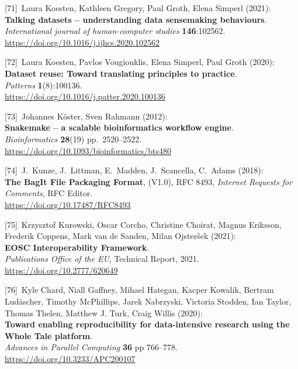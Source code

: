 {[}71{]}~Laura Koesten, Kathleen Gregory, Paul Groth, Elena Simperl
(2021):\\
\textbf{Talking datasets -- understanding data sensemaking
behaviours}.\\
\emph{International journal of human-computer studies}
\textbf{146}:102562.\\
\url{https://doi.org/10.1016/j.ijhcs.2020.102562}

{[}72{]}~Laura Koesten, Pavlos Vougiouklis, Elena Simperl, Paul Groth
(2020):\\
\textbf{Dataset reuse: Toward translating principles to practice}.\\
\emph{Patterns} \textbf{1}(8):100136.\\
\url{https://doi.org/10.1016/j.patter.2020.100136}

{[}73{]}~Johannes Köster, Sven Rahmann (2012):\\
\textbf{Snakemake -- a scalable bioinformatics workflow engine}.\\
\emph{Bioinformatics} \textbf{28}(19) pp.~2520--2522.\\
\url{https://doi.org/10.1093/bioinformatics/bts480}

{[}74{]}~J.~Kunze, J.~Littman, E.~Madden, J.~Scancella, C.~Adams
(2018):\\
\textbf{The BagIt File Packaging Format}, (V1.0), RFC 8493,
\emph{Internet Requests for Comments}, RFC Editor.\\
\url{https://doi.org/10.17487/RFC8493}

{[}75{]}~Krzysztof Kurowski, Oscar Corcho, Christine Choirat, Magnus
Eriksson, Frederik Coppens, Mark van de Sanden, Milan Ojsteršek
(2021):\\
\textbf{EOSC Interoperability Framework}.\\
\emph{Publications Office of the EU}, Technical Report, 2021.\\
\url{https://doi.org/10.2777/620649}

{[}76{]}~Kyle Chard, Niall Gaffney, Mihael Hategan, Kacper Kowalik,
Bertram Ludäscher, Timothy McPhillips, Jarek Nabrzyski, Victoria
Stodden, Ian Taylor, Thomas Thelen, Matthew J. Turk, Craig Willis
(2020):\\
\textbf{Toward enabling reproducibility for data-intensive research
using the Whole Tale platform}.\\
\emph{Advances in Parallel Computing} \textbf{36} pp 766--778.\\
\url{https://doi.org/10.3233/APC200107}

